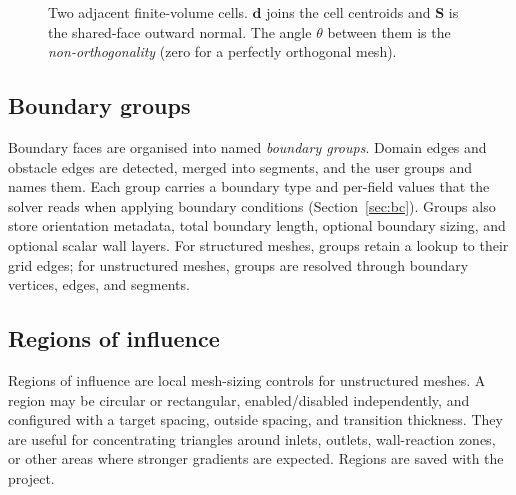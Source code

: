 \documentclass[11pt]{article}
\begin{document}
\begin{figure}[h]
\centering
{}
\caption{Two adjacent finite-volume cells. $\mathbf{d}$ joins the cell centroids and
$\mathbf{S}$ is the shared-face outward normal. The angle $\theta$ between them is the
\emph{non-orthogonality} (zero for a perfectly orthogonal mesh).}
\label{fig:fvcell}
\end{figure}

\subsection{Boundary groups}
Boundary faces are organised into named \emph{boundary groups}. Domain edges and
obstacle edges are detected, merged into segments, and the user groups and names them.
Each group carries a boundary type and per-field values that the solver reads when
applying boundary conditions (Section~\ref{sec:bc}). Groups also store orientation
metadata, total boundary length, optional boundary sizing, and optional scalar wall
layers. For structured meshes, groups retain a lookup to their grid edges; for
unstructured meshes, groups are resolved through boundary vertices, edges, and
segments.

\subsection{Regions of influence}
Regions of influence are local mesh-sizing controls for unstructured meshes. A region
may be circular or rectangular, enabled/disabled independently, and configured with a
target spacing, outside spacing, and transition thickness. They are useful for
concentrating triangles around inlets, outlets, wall-reaction zones, or other areas
where stronger gradients are expected. Regions are saved with the project.
\end{document}
